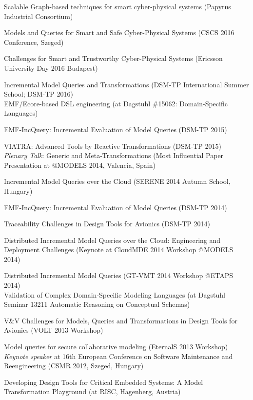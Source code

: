 \documentclass{xetexCV}
\begin{document}
Scalable  Graph-based techniques for smart cyber-physical systems (Papyrus Industrial Consortium)

Models and Queries for Smart and Safe Cyber-Physical Systems (CSCS 2016 Conference, Szeged)

Challenges for Smart and Trustworthy Cyber-Physical Systems (Ericsson University Day 2016 Budapest)

Incremental Model Queries and Transformations (DSM-TP International Summer School; DSM-TP 2016) \\

EMF/Ecore-based DSL engineering  (at Dagstuhl \#15062:  Domain-Specific Languages)

EMF-IncQuery: Incremental Evaluation of Model Queries (DSM-TP 2015)  

VIATRA: Advanced Tools by Reactive Transformations (DSM-TP 2015) \\

\emph{Plenary Talk}: Generic and Meta-Transformations  (Most Influential Paper Presentation at @MODELS 2014, Valencia, Spain)

Incremental Model Queries over the Cloud (SERENE 2014 Autumn School, Hungary)


EMF-IncQuery: Incremental Evaluation of Model Queries (DSM-TP 2014)


Traceability Challenges in Design Tools for Avionics (DSM-TP 2014) 

Distributed Incremental  Model Queries over the Cloud: Engineering and Deployment Challenges 
(Keynote at CloudMDE 2014 Workshop @MODELS 2014)


Distributed Incremental Model Queries (GT-VMT 2014 Workshop @ETAPS 2014) \\


Validation of Complex Domain-Specific Modeling Languages  (at Dagstuhl Seminar 13211 
Automatic Reasoning on Conceptual Schemas)


V\&V Challenges for Models, Queries and Transformations in Design Tools for Avionics (VOLT 2013 Workshop)


Model queries for secure collaborative modeling (EternalS 2013 Workshop) \\

\emph{Keynote speaker}  at 16th European Conference on Software Maintenance
and Reengineering (CSMR 2012, Szeged, Hungary) 

Developing Design Tools for Critical Embedded Systems: A Model Transformation Playground
(at RISC, Hagenberg, Austria) \\
\end{document}
